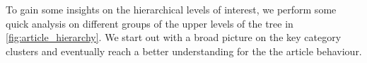 

To gain some insights on the hierarchical levels of interest, we perform some quick analysis on different groups of the upper levels of the tree in \autoref{fig:article_hierarchy}. We start out with a broad picture on the key category clusters 
and eventually reach a better understanding for the the article behaviour.\\
